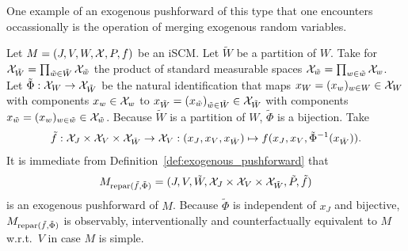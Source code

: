 One example of an exogenous pushforward of this type that one encounters occassionally is the operation of merging exogenous random variables.
\begin{Eg}\label{eg:merging_exogenous_random_variables_pushforward}
  Let $M = \left ( J, V, W, \mathcal{X}, P, f \right )$ be an iSCM.
  Let $\tilde{W}$ be a partition of $W$.
  Take for $\mathcal{X}_{\tilde{W}} = \prod_{\tilde{w}\in\tilde{W}} \mathcal{X}_{\tilde{w}}$ the product of standard measurable spaces $\mathcal{X}_{\tilde{w}} = \prod_{w \in \tilde{w}} \mathcal{X}_w$. 
  Let $\tilde{\Phi} : \mathcal{X}_W \to \mathcal{X}_{\tilde{W}}$ be the natural identification that
  maps $x_W = (x_w)_{w\in W} \in \mathcal{X}_W$ with components $x_w \in \mathcal{X}_w$ to $x_{\tilde{W}} = (x_{\tilde{w}})_{\tilde{w}\in\tilde{W}} \in \mathcal{X}_{\tilde{W}}$ with components $x_{\tilde{w}} = (x_w)_{w \in \tilde{w}} \in \mathcal{X}_{\tilde{w}}$.
  Because $\tilde{W}$ is a partition of $W$, $\tilde{\Phi}$ is a bijection.
  Take
  $$\tilde{f} : \mathcal{X}_{J} \times \mathcal{X}_{V} \times \mathcal{X}_{\tilde{W}} \to \mathcal{X}_{V} : (x_J,x_V,x_{\tilde{W}}) \mapsto f(x_J,x_V,\tilde{\Phi}^{-1}(x_{\tilde{W}})).$$
  It is immediate from Definition~\ref{def:exogenous_pushforward} that 
  $$M_{\mathrm{repar}({\tilde{f}},{\tilde{\Phi}})} = ( J, V, \tilde{W}, \mathcal{X}_J \times \mathcal{X}_V \times \mathcal{X}_{\tilde{W}}, \tilde{P}, \tilde{f} )$$
  is an exogenous pushforward of $M$.
  Because $\tilde{\Phi}$ is independent of $x_J$ and bijective, $M_{\mathrm{repar}({\tilde{f}},{\tilde{\Phi}})}$ is observably, interventionally and counterfactually equivalent to $M$ w.r.t.\ $V$ in case $M$ is simple.
\end{Eg}

